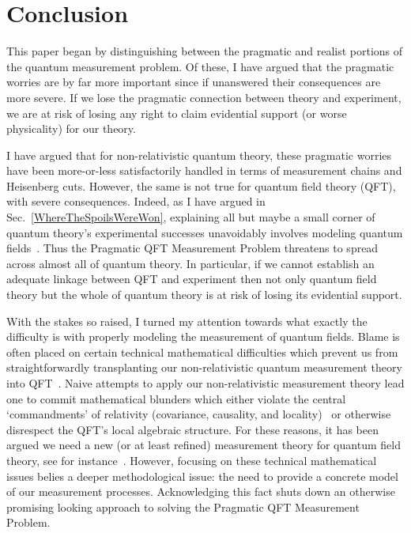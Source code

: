 \documentclass[12pt,prd,superscriptaddress,floatfix,amsmath,amssymb,amsfonts,nofootinbib]{revtex4-2}
\begin{document}
\section{Conclusion}\label{Conclusion}
This paper began by distinguishing between the pragmatic and realist portions of the quantum measurement problem. Of these, I have argued that the pragmatic worries are by far more important since if unanswered their consequences are more severe. If we lose the pragmatic connection between theory and experiment, we are at risk of losing any right to claim evidential support (or worse physicality) for our theory.

I have argued that for non-relativistic quantum theory, these pragmatic worries have been more-or-less satisfactorily handled in terms of measurement chains and Heisenberg cuts. However, the same is not true for quantum field theory (QFT), with severe consequences. Indeed, as I have argued in Sec.~\ref{WhereTheSpoilsWereWon}, explaining all but maybe a small corner of quantum theory's experimental successes unavoidably involves modeling quantum fields~\cite{WallaceBlueSkyTalk,WallaceBlueSkyPaper}. Thus the Pragmatic QFT Measurement Problem threatens to spread across almost all of quantum theory. In particular, if we cannot establish an adequate linkage between QFT and experiment then not only quantum field theory but the whole of quantum theory is at risk of losing its evidential support.

With the stakes so raised, I turned my attention towards what exactly the difficulty is with properly modeling the measurement of quantum fields. Blame is often placed on certain technical mathematical difficulties which prevent us from straightforwardly transplanting our non-relativistic quantum measurement theory into QFT~\cite{pologomez2021detectorbased,Jubb2022,BorstenJubbKells,fewster1,fewster2,fewster3,Anastopoulos2022,Sorkin,TaleOfTwo,Ruep2021,JoseMariaEdu,Sorkin,Redhead1995,Dowker,Dowker2,borsten,alvaro,Adam}. Naive attempts to apply our non-relativistic measurement theory lead one to commit mathematical blunders which either violate the central `commandments' of relativity (covariance, causality, and locality)~\cite{Sorkin,Redhead1995,Dowker,Dowker2,borsten,alvaro,Adam} or otherwise disrespect the QFT's local algebraic structure. For these reasons, it has been argued we need a new (or at least refined) measurement theory for quantum field theory, see for instance~\cite{pologomez2021detectorbased,Jubb2022,fewster2}. However, focusing on these technical mathematical issues belies a deeper methodological issue: the need to provide a concrete model of our measurement processes. Acknowledging this fact shuts down an otherwise promising looking approach to solving the Pragmatic QFT Measurement Problem.
\end{document}
